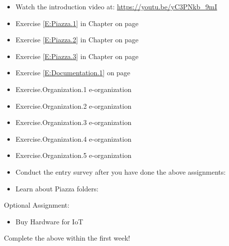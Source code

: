 \begin{itemize}\renewcommand{\labelitemi}{\scriptsize$\square$}
\item  Watch the introduction video at:
  \url{https://youtu.be/yC3PNkb_9mI}

\item Exercise \ref{E:Piazza.1} in Chapter  on page \pageref{E:Piazza.1}
\item Exercise \ref{E:Piazza.2} in Chapter  on page \pageref{E:Piazza.2}
\item Exercise \ref{E:Piazza.3} in Chapter  on page \pageref{E:Piazza.3} 
\item Exercise \ref{E:Documentation.1} on page \pageref{E:Documentation.1}

\item Exercise.Organization.1 e-organization
\item Exercise.Organization.2 e-organization
\item Exercise.Organization.3 e-organization
\item Exercise.Organization.4 e-organization
\item Exercise.Organization.5 e-organization
\item 
  Conduct the entry survey after you have done the above assignments:

\item 
  Learn about Piazza folders:
\end{itemize}

Optional Assignment:

\begin{itemize}
\item Buy Hardware for IoT
\end{itemize}

Complete the above within the first week!

